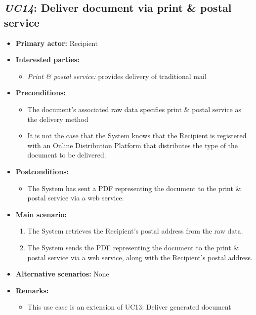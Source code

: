 \documentclass[a4paper,10pt]{article}
\begin{document}
\subsection{\emph{UC14}: Deliver document via print \& postal service}
\begin{itemize}
    \item \textbf{Primary actor:} Recipient
    \item \textbf{Interested parties:} 
        \begin{itemize}
            \item \textit{Print \& postal service:} provides delivery of traditional mail
        \end{itemize}

    \item \textbf{Preconditions:}
        \begin{itemize}
            \item The document's associated raw data specifies print \& postal service as the delivery method
            \item It is not the case that the System knows that the Recipient is registered with an Online Distribution Platform that distributes the type of the document to be delivered.
        \end{itemize}

    \item \textbf{Postconditions:}
        \begin{itemize}
            \item The System has sent a PDF representing the document to the print \& postal service via a web service.
        \end{itemize}
        
    \item \textbf{Main scenario:} 
    \begin{enumerate}
       \item The System retrieves the Recipient's postal address from the raw data.
       \item The System sends the PDF representing the document to the print \& postal service via a web service, along with the Recipient's postal address.
    \end{enumerate}

    \item \textbf{Alternative scenarios:} 
    None
    
    \item \textbf{Remarks:}
        \begin{itemize}
            \item This use case is an extension of UC13: Deliver generated document
        \end{itemize}
\end{itemize}
\end{document}
